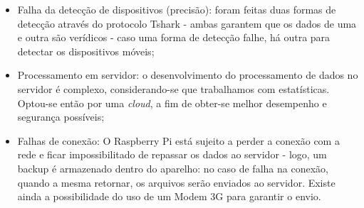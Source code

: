\begin{itemize}
  \item Falha da detecção de dispositivos (precisão): foram feitas duas formas de detecção através do protocolo Tshark - ambas garantem que os dados de uma e outra são verídicos - caso uma forma de detecção falhe, há outra para detectar os dispositivos móveis;
  \item Processamento em servidor: o desenvolvimento do processamento de dados no servidor é complexo, considerando-se que trabalhamos com estatísticas. Optou-se então por uma \emph{cloud}, a fim de obter-se melhor desempenho e segurança possíveis;
  \item Falhas de conexão: O Raspberry Pi está sujeito a perder a conexão com a rede e ficar impossibilitado de repassar os dados ao servidor - logo, um backup é armazenado dentro do aparelho: no caso de falha na conexão, quando a mesma retornar, os arquivos serão enviados ao servidor. Existe ainda a possibilidade do uso de um Modem 3G para garantir o envio.
\end{itemize}
